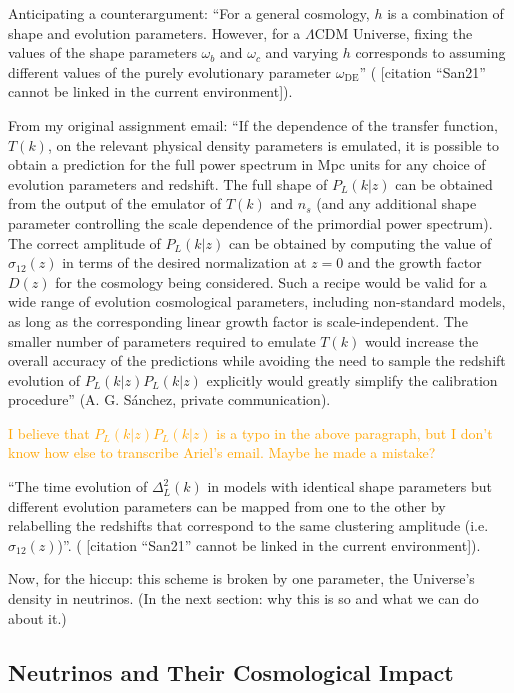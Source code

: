 \documentclass[11pt]{article}
\newcommand{\cbib}[1]
{\IfFileExists{biblatex.sty}
{\cite{#1}}
{[citation ``#1'' cannot be linked in the current environment]}}
\begin{document}
Anticipating a counterargument: ``For a general cosmology, $h$ is a combination
of shape and evolution parameters. However, for a $\Lambda$CDM Universe, fixing
the values of the shape parameters $\omega_b$ and $\omega_c$ and varying $h$
corresponds to assuming different values of the purely evolutionary parameter
$\omega_\text{DE}$'' (\cbib{San21}).

From my original assignment email:
``If the dependence of the transfer function, $T(k)$, on the relevant physical
density parameters is emulated, it is possible to obtain a prediction for the
full power spectrum in Mpc units for any choice of evolution parameters and
redshift. The full shape of $P_L(k|z)$ can be obtained from the output of the
emulator of $T(k)$ and $n_s$ (and any additional shape parameter controlling
the scale dependence of the primordial power spectrum). The correct amplitude
of $P_L(k|z)$ can be obtained by computing the value of $\sigma_{12}(z)$ in
terms of the desired normalization at $z=0$ and the growth factor $D(z)$ for
the cosmology being considered. Such a recipe would be valid for a wide range
of evolution cosmological parameters, including non-standard models, as long as
the corresponding linear growth factor is scale-independent. The smaller number
of parameters required to emulate $T(k)$ would increase the overall accuracy of
the predictions while avoiding the need to sample the redshift evolution of
$P_L(k|z) P_L(k|z)$ explicitly would greatly simplify the calibration
procedure'' (A. G. S\'{a}nchez, private communication).

\textcolor{orange}{I believe that $P_L(k|z) P_L(k|z)$ is a typo in the above
paragraph, but I don't know how else to transcribe Ariel's email. Maybe he
made a mistake?}

``The time evolution of $\Delta_L^2(k)$ in models with identical shape
parameters
but different evolution parameters can be mapped from one to the other by
relabelling the redshifts that correspond to the same clustering amplitude
(i.e. $\sigma_{12}(z)$)''.
(\cbib{San21}).

Now, for the hiccup: this scheme is broken by one parameter, the Universe's
density in neutrinos. (In the next section: why this is so and what we can do
about it.)

\begin{centering}
\section{Neutrinos and Their Cosmological Impact}
\end{centering}
\end{document}
